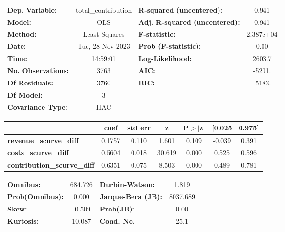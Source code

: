 \begin{center}
\begin{tabular}{lclc}
\toprule
\textbf{Dep. Variable:}             & total\_contribution & \textbf{  R-squared (uncentered):}      &     0.941   \\
\textbf{Model:}                     &         OLS         & \textbf{  Adj. R-squared (uncentered):} &     0.941   \\
\textbf{Method:}                    &    Least Squares    & \textbf{  F-statistic:       }          & 2.387e+04   \\
\textbf{Date:}                      &   Tue, 28 Nov 2023  & \textbf{  Prob (F-statistic):}          &     0.00    \\
\textbf{Time:}                      &       14:59:01      & \textbf{  Log-Likelihood:    }          &    2603.7   \\
\textbf{No. Observations:}          &          3763       & \textbf{  AIC:               }          &    -5201.   \\
\textbf{Df Residuals:}              &          3760       & \textbf{  BIC:               }          &    -5183.   \\
\textbf{Df Model:}                  &             3       & \textbf{                     }          &             \\
\textbf{Covariance Type:}           &         HAC         & \textbf{                     }          &             \\
\bottomrule
\end{tabular}
\begin{tabular}{lcccccc}
                                    & \textbf{coef} & \textbf{std err} & \textbf{z} & \textbf{P$> |$z$|$} & \textbf{[0.025} & \textbf{0.975]}  \\
\midrule
\textbf{revenue\_scurve\_diff}      &       0.1757  &        0.110     &     1.601  &         0.109        &       -0.039    &        0.391     \\
\textbf{costs\_scurve\_diff}        &       0.5604  &        0.018     &    30.619  &         0.000        &        0.525    &        0.596     \\
\textbf{contribution\_scurve\_diff} &       0.6351  &        0.075     &     8.503  &         0.000        &        0.489    &        0.781     \\
\bottomrule
\end{tabular}
\begin{tabular}{lclc}
\textbf{Omnibus:}       & 684.726 & \textbf{  Durbin-Watson:     } &    1.819  \\
\textbf{Prob(Omnibus):} &   0.000 & \textbf{  Jarque-Bera (JB):  } & 8037.689  \\
\textbf{Skew:}          &  -0.509 & \textbf{  Prob(JB):          } &     0.00  \\
\textbf{Kurtosis:}      &  10.087 & \textbf{  Cond. No.          } &     25.1  \\
\bottomrule
\end{tabular}
\end{center}